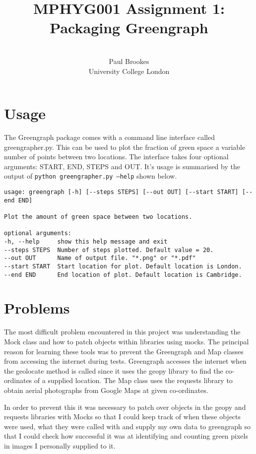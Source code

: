 \documentclass{article}
\title{MPHYG001 Assignment 1: Packaging Greengraph}
\author{\\
Paul Brookes\\
\normalsize University College London\\
}
\begin{document}
\maketitle
\section*{Usage}
The Greengraph package comes with a command line interface called greengrapher.py. This can be used to plot the fraction of green space a variable number of points between two locations. The interface takes four optional arguments: START, END, STEPS and OUT. It's usage is summarised by the output of \texttt{python greengrapher.py ---help} shown below.

\begin{lstlisting}
usage: greengraph [-h] [--steps STEPS] [--out OUT] [--start START] [--end END]

Plot the amount of green space between two locations.

optional arguments:
-h, --help     show this help message and exit
--steps STEPS  Number of steps plotted. Default value = 20.
--out OUT      Name of output file. "*.png" or "*.pdf"
--start START  Start location for plot. Default location is London.
--end END      End location of plot. Default location is Cambridge.
\end{lstlisting}

\section*{Problems}

The most difficult problem encountered in this project was understanding the Mock class and how to patch objects within libraries using mocks. The principal reason for learning these tools was to prevent the Greengraph and Map classes from accessing the internet during tests. Greengraph accesses the internet when the geolocate method is called since it uses the geopy library to find the co-ordinates of a supplied location. The Map class uses the requests library to obtain aerial photographs from Google Maps at given co-ordinates.

In order to prevent this it was necessary to patch over objects in the geopy and requests libraries with Mocks so that I could keep track of when these objects were used, what they were called with and supply my own data to greengraph so that I could check how successful it was at identifying and counting green pixels in images I personally supplied to it.
\end{document}
